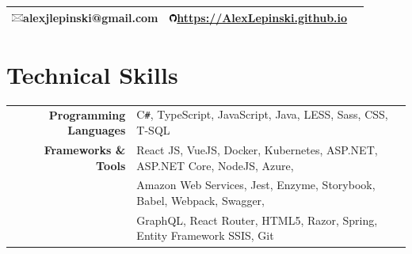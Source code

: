 \documentclass[10pt]{article}
\newcommand{\emailicon}{\includegraphics[height=2.4mm,keepaspectratio]{emailicon.jpg}}
\newcommand{\githubicon}{\includegraphics[height=2.6mm,keepaspectratio]{githubicon.png}}
\begin{document}
\pagestyle{empty} %

\par{\par}

\begin{center}{\def\arraystretch{1.5}
\begin{tabular}{ccc}
    \hline\hline
    \emailicon  \space alexjlepinski@gmail.com &
    \githubicon \space \url{https://AlexLepinski.github.io}\\
	\hline\hline
\end{tabular}
}\end{center}

\vspace*{-\baselineskip}
\vspace{3mm}


\vspace*{-\baselineskip}
\vspace{5mm}

\section{Technical Skills}

\begin{tabular}{rp{13.1cm}}
\textbf{\space Programming Languages}
	&  \textsc{C\texttt{\#}}, TypeScript, JavaScript,
    Java, LESS, Sass, CSS, T-SQL\\
\textbf{\space Frameworks \& Tools}
	& React JS, VueJS, Docker, Kubernetes, ASP.NET, ASP.NET Core, NodeJS, Azure, \\
	& Amazon Web Services, Jest, Enzyme, Storybook, Babel, Webpack, Swagger, \\ 
	& GraphQL,  React Router, HTML5, Razor, Spring, Entity Framework SSIS, Git \\
\end{tabular}
\vspace*{-\baselineskip}
\vspace{3mm}

\vspace*{-\baselineskip}
\vspace{3mm}
\end{document}
